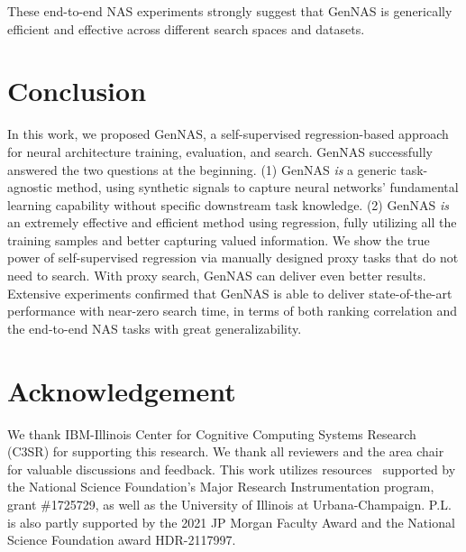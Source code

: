 \documentclass{article}
\begin{document}
These end-to-end NAS experiments strongly suggest that GenNAS is generically efficient and effective across different search spaces and datasets.

\vspace{-8pt}
\section{Conclusion}
\vspace{-8pt}
In this work, we proposed GenNAS, a self-supervised regression-based approach for neural architecture training, evaluation, and search.
GenNAS successfully answered the two questions at the beginning.
(1) GenNAS \textit{is} a generic task-agnostic method, using synthetic signals to capture neural networks' fundamental learning capability without specific downstream task knowledge.
(2) GenNAS \textit{is} an extremely effective and efficient method using regression, fully utilizing all the training samples and better capturing valued information.
We show the true power of self-supervised regression via manually designed proxy tasks that do not need to search. 
With proxy search, GenNAS can deliver even better results.
Extensive experiments confirmed that GenNAS is able to deliver state-of-the-art performance with near-zero search time, in terms of both ranking correlation and the end-to-end NAS tasks with great generalizability.
\vspace{-4pt}

\section{Acknowledgement}
We thank IBM-Illinois Center for Cognitive Computing Systems Research (C3SR) for supporting this research. 
We thank all reviewers and the area chair for valuable discussions and feedback.
This work utilizes resources~\cite{kindratenko2020hal} supported by the National Science Foundation’s Major Research Instrumentation program, grant \#1725729, as well as the University of Illinois at Urbana-Champaign. P.L. is also partly supported by the 2021 JP Morgan Faculty Award and the National Science Foundation award HDR-2117997.







\end{document}
